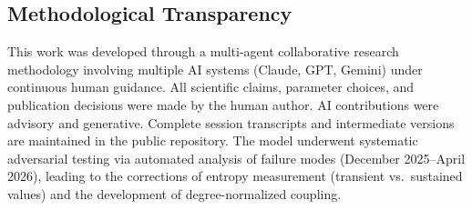 ﻿\documentclass[11pt]{article}
\begin{document}
\subsection{Methodological Transparency}
This work was developed through a multi-agent collaborative research methodology involving multiple AI systems (Claude, GPT, Gemini) under continuous human guidance. All scientific claims, parameter choices, and publication decisions were made by the human author. AI contributions were advisory and generative. Complete session transcripts and intermediate versions are maintained in the public repository. The model underwent systematic adversarial testing via automated analysis of failure modes (December 2025--April 2026), leading to the corrections of entropy measurement (transient vs.\ sustained values) and the development of degree-normalized coupling.
\end{document}
